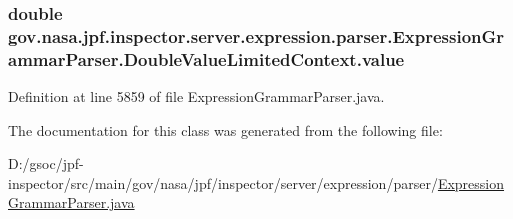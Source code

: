 \subsubsection[{\texorpdfstring{value}{value}}]{\setlength{\rightskip}{0pt plus 5cm}double gov.\+nasa.\+jpf.\+inspector.\+server.\+expression.\+parser.\+Expression\+Grammar\+Parser.\+Double\+Value\+Limited\+Context.\+value}\hypertarget{classgov_1_1nasa_1_1jpf_1_1inspector_1_1server_1_1expression_1_1parser_1_1_expression_grammar_pa747378014be7c4ab66961e5db1be8d25_ab74a50bd90115e4597e727b42aa1c8d2}{}\label{classgov_1_1nasa_1_1jpf_1_1inspector_1_1server_1_1expression_1_1parser_1_1_expression_grammar_pa747378014be7c4ab66961e5db1be8d25_ab74a50bd90115e4597e727b42aa1c8d2}


Definition at line 5859 of file Expression\+Grammar\+Parser.\+java.



The documentation for this class was generated from the following file\+:\begin{DoxyCompactItemize}
\item 
D\+:/gsoc/jpf-\/inspector/src/main/gov/nasa/jpf/inspector/server/expression/parser/\hyperlink{_expression_grammar_parser_8java}{Expression\+Grammar\+Parser.\+java}\end{DoxyCompactItemize}

